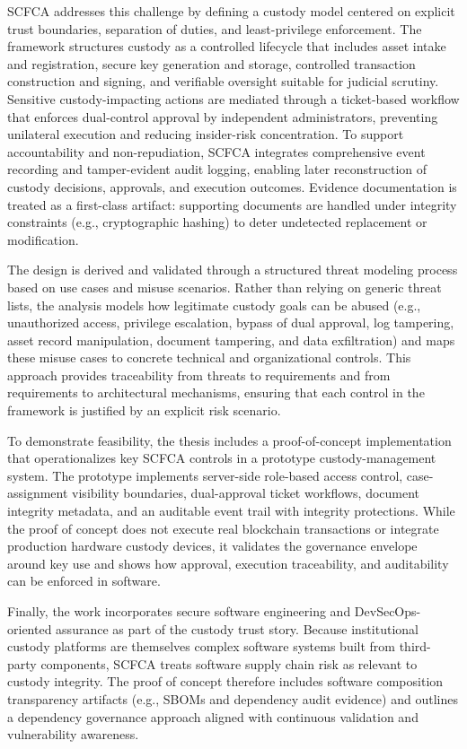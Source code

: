 \documentclass[12pt,a4paper]{report}
\begin{document}
SCFCA addresses this challenge by defining a custody model centered on explicit trust boundaries, separation of duties, and least-privilege enforcement. The framework structures custody as a controlled lifecycle that includes asset intake and registration, secure key generation and storage, controlled transaction construction and signing, and verifiable oversight suitable for judicial scrutiny. Sensitive custody-impacting actions are mediated through a ticket-based workflow that enforces dual-control approval by independent administrators, preventing unilateral execution and reducing insider-risk concentration. To support accountability and non-repudiation, SCFCA integrates comprehensive event recording and tamper-evident audit logging, enabling later reconstruction of custody decisions, approvals, and execution outcomes. Evidence documentation is treated as a first-class artifact: supporting documents are handled under integrity constraints (e.g., cryptographic hashing) to deter undetected replacement or modification.

The design is derived and validated through a structured threat modeling process based on use cases and misuse scenarios. Rather than relying on generic threat lists, the analysis models how legitimate custody goals can be abused (e.g., unauthorized access, privilege escalation, bypass of dual approval, log tampering, asset record manipulation, document tampering, and data exfiltration) and maps these misuse cases to concrete technical and organizational controls. This approach provides traceability from threats to requirements and from requirements to architectural mechanisms, ensuring that each control in the framework is justified by an explicit risk scenario.

To demonstrate feasibility, the thesis includes a proof-of-concept implementation that operationalizes key SCFCA controls in a prototype custody-management system. The prototype implements server-side role-based access control, case-assignment visibility boundaries, dual-approval ticket workflows, document integrity metadata, and an auditable event trail with integrity protections. While the proof of concept does not execute real blockchain transactions or integrate production hardware custody devices, it validates the governance envelope around key use and shows how approval, execution traceability, and auditability can be enforced in software.

Finally, the work incorporates secure software engineering and DevSecOps-oriented assurance as part of the custody trust story. Because institutional custody platforms are themselves complex software systems built from third-party components, SCFCA treats software supply chain risk as relevant to custody integrity. The proof of concept therefore includes software composition transparency artifacts (e.g., SBOMs and dependency audit evidence) and outlines a dependency governance approach aligned with continuous validation and vulnerability awareness.
\end{document}

